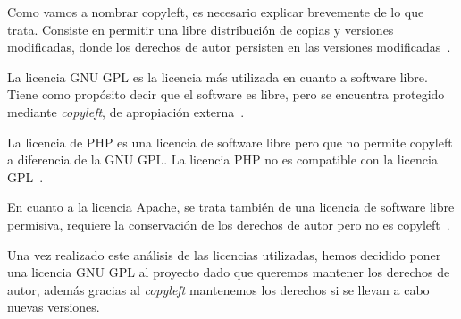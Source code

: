 Como vamos a nombrar copyleft, es necesario explicar brevemente de lo que trata. Consiste en permitir una libre distribución de copias y versiones modificadas, donde los derechos de autor persisten en las versiones modificadas~\cite{wiki:copyleft}.

La licencia GNU GPL es la licencia más utilizada en cuanto a software libre. Tiene como propósito decir que el software es libre, pero se encuentra protegido mediante \textit{copyleft}, de apropiación externa~\cite{wiki:gnu_gpl}.

La licencia de PHP es una licencia de software libre pero que no permite copyleft a diferencia de la GNU GPL. La licencia PHP no es compatible con la licencia GPL~\cite{wiki:licencia_php}.

En cuanto a la licencia Apache, se trata también de una licencia de software libre permisiva, requiere la conservación de los derechos de autor pero no es copyleft~\cite{wiki:licencia_apache}.

Una vez realizado este análisis de las licencias utilizadas, hemos decidido poner una licencia GNU GPL al  proyecto dado que queremos mantener los derechos de autor, además gracias al \textit{copyleft} mantenemos los derechos si se llevan a cabo nuevas versiones.

